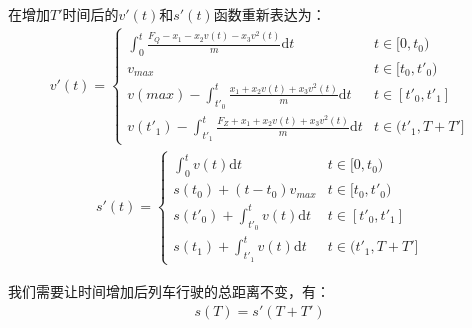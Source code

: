 \documentclass[12pt,a4paper]{nmmcm}
\begin{document}
在增加$T'$时间后的$v'(t)$和$s'(t)$函数重新表达为：
\begin{eqnarray}
v'(t)=\left\{\begin{matrix}
 \int_0^t\frac{F_Q-x_1-x_2v(t)-x_3v^2(t)}{m}\mathrm{d}t &t\in[0,t_0) \\
 v_{max} &t\in [t_0,t'_0) \\
v(max)-\int_{t'_0}^{t}\frac{x_1+x_2v(t)+x_3v^2(t)}{m}\mathrm{d}t&t\in [t'_0,t'_1]\\
  v(t'_1)-\int_{t'_1}^{t}\frac{F_Z+x_1+x_2v(t)+x_3v^2(t)}{m}\mathrm{d}t &t\in (t'_1,T+T']
\end{matrix}\right.
\end{eqnarray}
\begin{eqnarray}
s'(t)=\left\{\begin{matrix}
 \int_0^tv(t) \mathrm{d}t &t\in[0,t_0) \\
 s(t_0)+(t-t_0)v_{max} &t\in [t_0,t'_0) \\
s(t'_0)+\int_{t'_0}^tv(t)\mathrm{d}t&t\in [t'_0,t'_1]\\
  s(t_1)+\int_{t'_1}^tv(t)\mathrm{d}t&t\in (t'_1,T+T']
\end{matrix}\right.
\end{eqnarray}

我们需要让时间增加后列车行驶的总距离不变，有：
\begin{eqnarray}
s(T)=s'(T+T')
\end{eqnarray}
\end{document}
